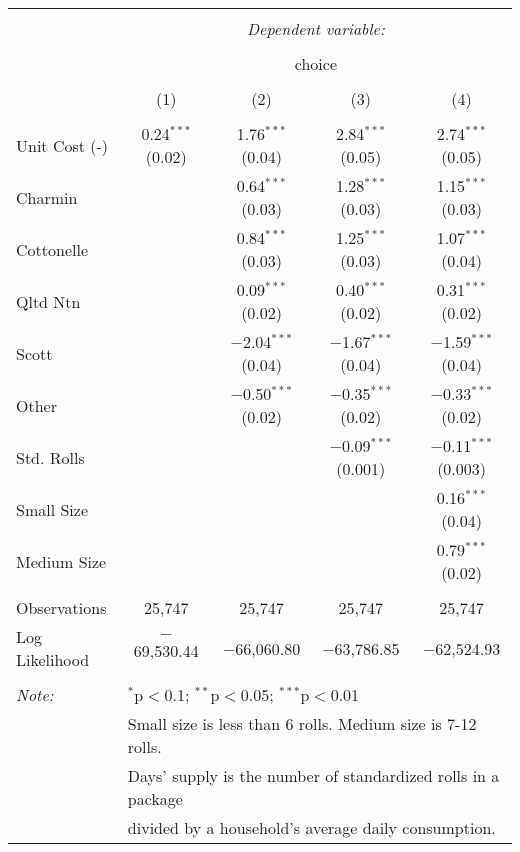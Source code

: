 
\begin{table}[!htbp] \centering 
  \caption{} 
  \label{tab:mnlColumbusBaseline} 
\begin{tabular}{@{\extracolsep{5pt}}lcccc} 
\\[-1.8ex]\hline 
\hline \\[-1.8ex] 
 & \multicolumn{4}{c}{\textit{Dependent variable:}} \\ 
\cline{2-5} 
\\[-1.8ex] & \multicolumn{4}{c}{choice} \\ 
\\[-1.8ex] & (1) & (2) & (3) & (4)\\ 
\hline \\[-1.8ex] 
 Unit Cost (-) & 0.24$^{***}$ (0.02) & 1.76$^{***}$ (0.04) & 2.84$^{***}$ (0.05) & 2.74$^{***}$ (0.05) \\ 
  Charmin &  & 0.64$^{***}$ (0.03) & 1.28$^{***}$ (0.03) & 1.15$^{***}$ (0.03) \\ 
  Cottonelle &  & 0.84$^{***}$ (0.03) & 1.25$^{***}$ (0.03) & 1.07$^{***}$ (0.04) \\ 
  Qltd Ntn &  & 0.09$^{***}$ (0.02) & 0.40$^{***}$ (0.02) & 0.31$^{***}$ (0.02) \\ 
  Scott &  & $-$2.04$^{***}$ (0.04) & $-$1.67$^{***}$ (0.04) & $-$1.59$^{***}$ (0.04) \\ 
  Other &  & $-$0.50$^{***}$ (0.02) & $-$0.35$^{***}$ (0.02) & $-$0.33$^{***}$ (0.02) \\ 
  Std. Rolls &  &  & $-$0.09$^{***}$ (0.001) & $-$0.11$^{***}$ (0.003) \\ 
  Small Size &  &  &  & 0.16$^{***}$ (0.04) \\ 
  Medium Size &  &  &  & 0.79$^{***}$ (0.02) \\ 
 \hline \\[-1.8ex] 
Observations & 25,747 & 25,747 & 25,747 & 25,747 \\ 
Log Likelihood & $-$69,530.44 & $-$66,060.80 & $-$63,786.85 & $-$62,524.93 \\ 
\hline 
\hline \\[-1.8ex] 
\textit{Note:}  & \multicolumn{4}{l}{$^{*}$p$<$0.1; $^{**}$p$<$0.05; $^{***}$p$<$0.01} \\ 
 & \multicolumn{4}{l}{Small size is less than 6 rolls. Medium size is 7-12 rolls. } \\ 
 & \multicolumn{4}{l}{Days' supply is the number of standardized rolls in a package} \\ 
 & \multicolumn{4}{l}{divided by a household's average daily consumption.} \\ 
\end{tabular} 
\end{table} 
